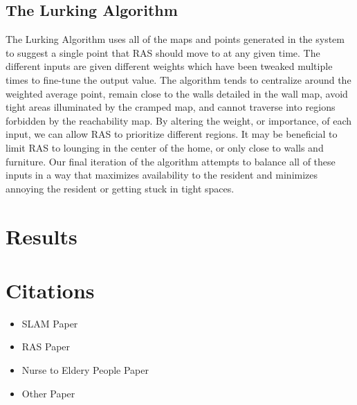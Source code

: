 \documentclass[11pt, conference, a4paper]{IEEEtran}
\begin{document}
\subsection{The Lurking Algorithm}
The Lurking Algorithm uses all of the maps and points generated in the system to suggest a single point that RAS should move to at any given time. The different inputs are given different weights which have been tweaked multiple times to fine-tune the output value. The algorithm tends to centralize around the weighted average point, remain close to the walls detailed in the wall map, avoid tight areas illuminated by the cramped map, and cannot traverse into regions forbidden by the reachability map. By altering the weight, or importance, of each input, we can allow RAS to prioritize different regions. It may be beneficial to limit RAS to lounging in the center of the home, or only close to walls and furniture. Our final iteration of the algorithm attempts to balance all of these inputs in a way that maximizes availability to the resident and minimizes annoying the resident or getting stuck in tight spaces. 

\section{Results}


\section{Citations}
\begin{itemize}
    \item SLAM Paper
    \item RAS Paper
    \item Nurse to Eldery People Paper
    \item Other Paper
\end{itemize}
\end{document}
